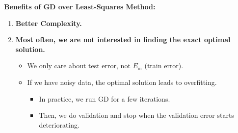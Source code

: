 \begin{intuition}
    \textbf{Benefits of GD over Least-Squares Method:}
    \begin{enumerate}
        \item \textbf{Better Complexity.}
        
        \item \textbf{Most often, we are not interested in finding the exact optimal solution.}
        \begin{itemize}
            \item We only care about test error, not \( E_{\text{in}} \) (train error).
            \item If we have noisy data, the optimal solution leads to overfitting.
            \begin{itemize}
                \item In practice, we run GD for a few iterations.
                \item Then, we do validation and stop when the validation error starts deteriorating.
            \end{itemize}
        \end{itemize}
    \end{enumerate}
\end{intuition}

